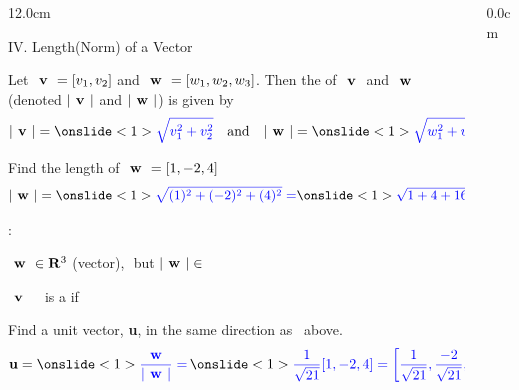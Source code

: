 \begin{frame}
\begin{columns}
\begin{column}{12.0cm}

{IV. Length(Norm) of a Vector}

\vspace{0.2cm}

\scriptsize

\DEF Let $\textbf{ v } = [v_1,v_2]$ and $\textbf{ w } = [w_1,w_2,w_3]$.  Then the  of $\textbf{ v }$ and $\textbf{ w }$ (denoted $|\textbf{ v }|$ and $|\textbf{ w }|$) is given by
\begin{align*}
	|\V| = \ON<1>{\B{\sqrt{v_1^2 + v_2^2}}} \quad \text{and} \quad |\W| = \ON<1>{\B{\sqrt{w_1^2 + w_2^2 + w_3^2}}}
\end{align*}

\EX Find the length of $\textbf{ w } = [1,-2,4]$
\begin{align*}
	|\W| = \ON<1>{\B{\sqrt{(1)^2 + (-2)^2 + (4)^2} =}} \ON<1>{\B{\sqrt{1+4+16} = \sqrt{21}}}
\end{align*}

:

\vspace{0.1cm}

\OBUL $\textbf{ w } \in \mathbf{R}^3$ (vector),\,\, but $|\textbf{ w }| \in $ \\

\vspace{0.4cm}

\DEF $\textbf{ v }$ \,\,\, is a  if \,\,\, 

\vspace{0.4cm}

\EX Find a unit vector, {\bf u}, in the same direction as \W \, above.
\begin{align*}
	{\bf u} = \ON<1>{\B{\frac{\W}{|\W|} =\,}} \ON<1>{\B{\frac{1}{\sqrt{21}}[1,-2,4] = \left[\frac{1}{\sqrt{21}},\frac{-2}{\sqrt{21}},\frac{4}{\sqrt{21}}\right]}} \\
\end{align*}

\end{column}
\begin{column}{0.0cm}\end{column}
\end{columns}
\end{frame}

